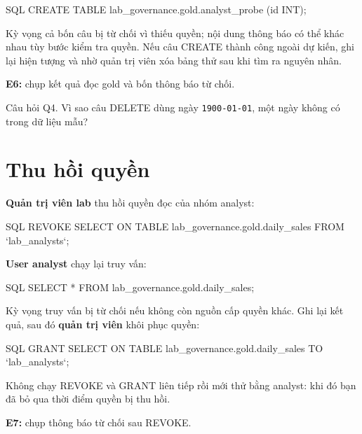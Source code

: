 \begin{aivncodebox}[language={}]{SQL}
CREATE TABLE lab_governance.gold.analyst_probe (id INT);
\end{aivncodebox}

Kỳ vọng cả bốn câu bị từ chối vì thiếu quyền; nội dung thông báo có thể khác nhau tùy bước kiểm tra quyền. Nếu câu CREATE thành công ngoài dự kiến, ghi lại hiện tượng và nhờ quản trị viên xóa bảng thử sau khi tìm ra nguyên nhân.


\begin{evidencebox}
\textbf{E6:} chụp kết quả đọc gold và bốn thông báo từ chối.
\end{evidencebox}

\begin{questionbox}{Câu hỏi Q4.}
Vì sao câu DELETE dùng ngày \texttt{1900-\allowbreak{}01-\allowbreak{}01}, một ngày không có trong dữ liệu mẫu?
\end{questionbox}

\section{Thu hồi quyền}

\textbf{Quản trị viên lab} thu hồi quyền đọc của nhóm analyst:


\begin{aivncodebox}[language={}]{SQL}
REVOKE SELECT ON TABLE lab_governance.gold.daily_sales FROM `lab_analysts`;
\end{aivncodebox}

\textbf{User analyst} chạy lại truy vấn:


\begin{aivncodebox}[language={}]{SQL}
SELECT * FROM lab_governance.gold.daily_sales;
\end{aivncodebox}

Kỳ vọng truy vấn bị từ chối nếu không còn nguồn cấp quyền khác. Ghi lại kết quả, sau đó \textbf{quản trị viên} khôi phục quyền:


\begin{aivncodebox}[language={}]{SQL}
GRANT SELECT ON TABLE lab_governance.gold.daily_sales TO `lab_analysts`;
\end{aivncodebox}

Không chạy REVOKE và GRANT liên tiếp rồi mới thử bằng analyst: khi đó bạn đã bỏ qua thời điểm quyền bị thu hồi.


\begin{evidencebox}
\textbf{E7:} chụp thông báo từ chối sau REVOKE.
\end{evidencebox}

